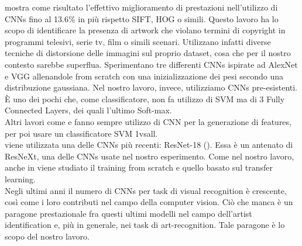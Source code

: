 \documentclass{article}
\begin{document}
\cite{hong2017} mostra come risultato l'effettivo miglioramento di prestazioni nell'utilizzo di CNNs fino al 13.6\% in più rispetto SIFT, HOG o simili. Questo lavoro ha lo scopo di identificare la presenza di artwork che violano termini di copyright in programmi telesivi, serie tv, film o simili scenari. Utilizzano infatti diverse tecniche di distorsione delle immagini sul proprio dataset, cosa che per il nostro contesto sarebbe superflua. Sperimentano tre differenti CNNs ispirate ad AlexNet e VGG  allenandole from scratch con una inizializzazione dei pesi secondo una distribuzione gaussiana. Nel nostro lavoro, invece, utilizziamo CNNs pre-esistenti. È uno dei pochi che, come classificatore, non fa utilizzo di  SVM ma di 3 Fully Connected Layers, dei quali l'ultimo Soft-max.\\
Altri lavori come \cite{Bar2014} e \cite{razavian2014} fanno sempre utilizzo di CNN per la generazione di features, per poi usare un classificatore SVM 1vsall.\\
\cite{ArtistIdCNN406} viene utilizzata una delle CNNs più recenti: ResNet-18 (\cite{resnet}). Essa è un antenato di ResNeXt, una delle CNNs usate nel nostro esperimento. Come nel nostro lavoro, anche in \cite{ArtistIdCNN406} viene studiato il training from scratch e quello basato sul transfer learning.
\\

Negli ultimi anni il numero di CNNs per task di visual recognition è crescente, così come i loro contributi nel campo della computer vision. Ciò che manca è un paragone prestazionale fra questi ultimi modelli nel campo dell'artist identification e, più in generale, nei task di art-recognition. Tale paragone è lo scopo del nostro lavoro.
\end{document}
